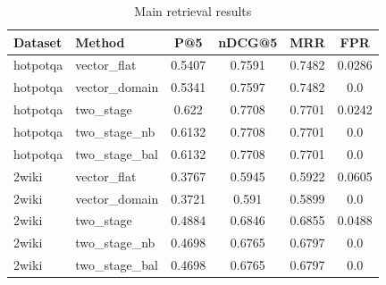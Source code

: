 \begin{table}[ht]
\centering\caption{Main retrieval results}\label{tab:main}
\begin{tabular}{llcccc}
\toprule
Dataset & Method & P@5 & nDCG@5 & MRR & FPR \\
\midrule
hotpotqa & vector_flat & 0.5407 & 0.7591 & 0.7482 & 0.0286 \\
hotpotqa & vector_domain & 0.5341 & 0.7597 & 0.7482 & 0.0 \\
hotpotqa & two_stage & 0.622 & 0.7708 & 0.7701 & 0.0242 \\
hotpotqa & two_stage_nb & 0.6132 & 0.7708 & 0.7701 & 0.0 \\
hotpotqa & two_stage_bal & 0.6132 & 0.7708 & 0.7701 & 0.0 \\
2wiki & vector_flat & 0.3767 & 0.5945 & 0.5922 & 0.0605 \\
2wiki & vector_domain & 0.3721 & 0.591 & 0.5899 & 0.0 \\
2wiki & two_stage & 0.4884 & 0.6846 & 0.6855 & 0.0488 \\
2wiki & two_stage_nb & 0.4698 & 0.6765 & 0.6797 & 0.0 \\
2wiki & two_stage_bal & 0.4698 & 0.6765 & 0.6797 & 0.0 \\
\bottomrule
\end{tabular}
\end{table}
